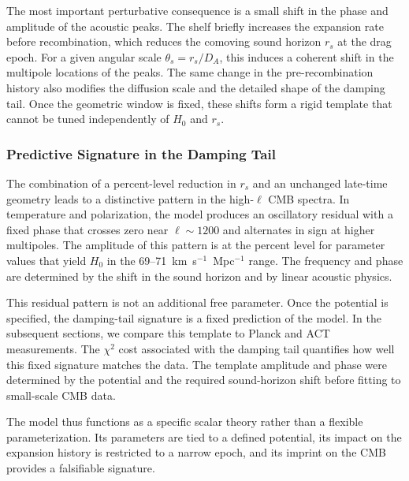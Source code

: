 \documentclass[a4paper,11pt]{article}
\begin{document}
The most important perturbative consequence is a small shift in the phase and amplitude of the acoustic peaks. The shelf briefly increases the expansion rate before recombination, which reduces the comoving sound horizon $r_{s}$ at the drag epoch. For a given angular scale $\theta_{s} = r_{s}/D_{A}$, this induces a coherent shift in the multipole locations of the peaks. The same change in the pre-recombination history also modifies the diffusion scale and the detailed shape of the damping tail. Once the geometric window is fixed, these shifts form a rigid template that cannot be tuned independently of $H_{0}$ and $r_{s}$.

\subsubsection{Predictive Signature in the Damping Tail}

The combination of a percent-level reduction in $r_{s}$ and an unchanged late-time geometry leads to a distinctive pattern in the high-$\ell$ CMB spectra. In temperature and polarization, the model produces an oscillatory residual with a fixed phase that crosses zero near $\ell \sim 1200$ and alternates in sign at higher multipoles. The amplitude of this pattern is at the percent level for parameter values that yield $H_{0}$ in the 69--71~km~s$^{-1}$~Mpc$^{-1}$ range. The frequency and phase are determined by the shift in the sound horizon and by linear acoustic physics.

This residual pattern is not an additional free parameter. Once the potential is specified, the damping-tail signature is a fixed prediction of the model. In the subsequent sections, we compare this template to Planck and ACT measurements. The $\chi^{2}$ cost associated with the damping tail quantifies how well this fixed signature matches the data. The template amplitude and phase were determined by the potential and the required sound-horizon shift before fitting to small-scale CMB data.

The model thus functions as a specific scalar theory rather than a flexible parameterization. Its parameters are tied to a defined potential, its impact on the expansion history is restricted to a narrow epoch, and its imprint on the CMB provides a falsifiable signature.

\end{document}
